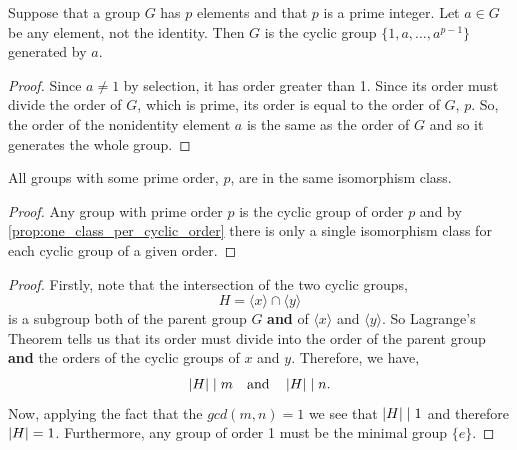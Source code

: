 \documentclass[MathsNotesBase.tex]{subfiles}
\begin{document}
{		\medskip
		\begin{corollary}
			\label{coro:prime_order_groups_are_cyclic}
			Suppose that a group $G$ has $p$ elements and that $p$ is a prime integer. Let $a \in G$ be any element, not the identity. Then $G$ is the cyclic group $\{1, a, \dots , a^{p-1}\}$ generated by $a$.
		\end{corollary}
		\begin{proof}
			Since $a \neq 1$ by selection, it has order greater than 1. Since its order must divide the order of $G$, which is prime, its order is equal to the order of $G$, $p$. So, the order of the nonidentity element $a$ is the same as the order of $G$ and so it generates the whole group.
		\end{proof}
	
		\medskip
		\begin{corollary}
			All groups with some prime order, $p$, are in the same isomorphism class.
		\end{corollary}
		\begin{proof}
			Any group with prime order $p$ is the cyclic group of order $p$ and by \autoref{prop:one_class_per_cyclic_order} there is only a single isomorphism class for each cyclic group of a given order.
		\end{proof}
	
		\bigskip
		\begin{proof}	
			Firstly, note that the intersection of the two cyclic groups,
			\[ H = \langle x \rangle \cap \langle y \rangle \]
			is a subgroup both of the parent group $G$ \textbf{and} of ${ \langle x \rangle }$ and ${ \langle y \rangle }$. So Lagrange's Theorem tells us that its order must divide into the order of the parent group \textbf{and} the orders of the cyclic groups of $x$ and $y$. Therefore, we have,
			\[ \left\lvert H\right\rvert \mid m \hspace{10pt}\text{and}\hspace{10pt} \left\lvert H\right\rvert \mid n. \]
			Now, applying the fact that the ${ gcd(m,n) = 1 }$ we see that ${ \left\lvert H\right\rvert \mid 1 }$ and therefore ${ \left\lvert H\right\rvert = 1 }$. Furthermore, any group of order 1 must be the minimal group ${ \{e\} }$.		
		\end{proof}
	
}
\end{document}
